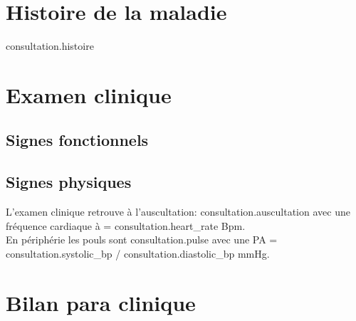 \documentclass[headlines=6,headinclude=true,10pt]{scrartcl}
\begin{document}
                  \section{Histoire de la maladie}
                  {{ consultation.histoire }}
                  


                  \section{Examen clinique}
                  \subsection{Signes fonctionnels}
                  \begin{itemize}
                    {%
                      {%
                        {%
     {%

\end{itemize}
\subsection{Signes physiques}
 L'examen clinique retrouve à l'auscultation: {{ consultation.auscultation }} avec
 une fréquence cardiaque à = {{ consultation.heart_rate}} Bpm.\\

 En périphérie les pouls sont {{ consultation.pulse }} avec une PA = {{ consultation.systolic_bp }}/{{ consultation.diastolic_bp }}mmHg.\\

\section{Bilan para clinique}
\end{document}
